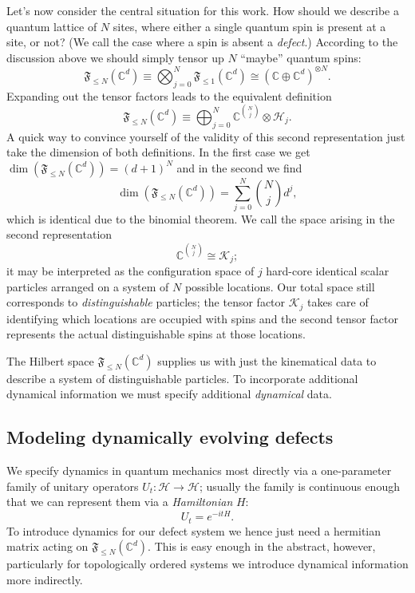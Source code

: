 \documentclass[aps,prb,twocolumn,superscriptaddress,noshowkeys]{revtex4-2}  %
\theoremstyle{plain}%
\theoremstyle{definition}
\theoremstyle{remark}
\begin{document}
Let's now consider the central situation for this work. How should we describe a quantum lattice of $N$ sites, where either a single quantum spin is present at a site, or not? (We call the case where a spin is absent a \emph{defect}.) According to the discussion above we should simply tensor up $N$ ``maybe'' quantum spins:
\begin{equation}
\mathfrak{F}_{\le N}(\mathbb{C}^d) \equiv \bigotimes_{j=0}^N \mathfrak{F}_{\le 1}(\mathbb{C}^d) \cong (\mathbb{C}\oplus \mathbb{C}^d)^{\otimes N}.
\end{equation}
Expanding out the tensor factors leads to the equivalent definition
\begin{equation}
\mathfrak{F}_{\le N}(\mathbb{C}^d) \equiv \bigoplus_{j=0}^N \mathbb{C}^{\binom{N}{j}}\otimes \mathcal{H}_j.
\end{equation}
A quick way to convince yourself of the validity of this second representation just take the dimension of both definitions. In the first case we get $\dim(\mathfrak{F}_{\le N}(\mathbb{C}^d)) = (d+1)^N$ and in the second we find
\begin{equation}
\dim(\mathfrak{F}_{\le N}(\mathbb{C}^d)) = \sum_{j=0}^N \binom{N}{j} d^j,
\end{equation}
which is identical due to the binomial theorem. We call the space arising in the second representation
\begin{equation}
\mathbb{C}^{\binom{N}{j}} \cong \mathcal{K}_{j};
\end{equation}
it may be interpreted as the configuration space of $j$ hard-core identical scalar particles arranged on a system of $N$ possible locations. Our total space still corresponds to \emph{distinguishable} particles; the tensor factor $\mathcal{K}_j$ takes care of identifying which locations are occupied with spins and the second tensor factor represents the actual distinguishable spins at those locations.

The Hilbert space $\mathfrak{F}_{\le N}(\mathbb{C}^d)$ supplies us with just the kinematical data to describe a system of distinguishable particles. To incorporate additional dynamical information we must specify additional \emph{dynamical} data.

\subsection{Modeling dynamically evolving defects}
\label{Intro_dynamics}

We specify dynamics in quantum mechanics most directly via a one-parameter family of unitary operators $U_t:\mathcal{H}\rightarrow\mathcal{H}$; usually the family is continuous enough that we can represent them via a \emph{Hamiltonian} $H$:
\begin{equation}
U_t = e^{-it H}.
\end{equation}
To introduce dynamics for our defect system we hence just need a hermitian matrix acting on $\mathfrak{F}_{\le N}(\mathbb{C}^d)$. This is easy enough in the abstract, however, particularly for topologically ordered systems we introduce dynamical information more indirectly.
\end{document}
